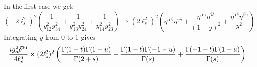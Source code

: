 \documentclass[11pt, class=article, crop=false]{standalone}
\begin{document}
\begin{enumerate}
	In the first case we get:
	\[
		\left(-2 \ell_s^2\right)^2 \left(\frac{1}{y_{12}^2 y_{34}^2} + \frac{1}{y_{13}^2 y_{24}^2} + \frac{1}{y_{14}^2 y_{23}^2} \right) \to \left(2 \ell_s^2\right)^2  \left(\eta^{\alpha \beta} \eta^{\gamma \delta} + \frac{\eta^{\alpha \gamma} \eta^{\beta \delta}}{(1-y)^{2}} + \frac{\eta^{\alpha \delta} \eta^{\beta \gamma}}{y^{2}} \right)  %
	\]
	Integrating $y$ from $0$ to $1$ gives
	\begin{equation}\label{eq:part1}
		\frac{i g_o^2 \cancel\delta^{26}}{4 \ell_s^6} \times (2 \ell_s^2)^2 \left(\frac{\Gamma(1-t) \Gamma(1-u)}{\Gamma(2+s)} + \frac{\Gamma(1-t) \Gamma(-1-u)}{\Gamma(s)} + \frac{\Gamma(-1-t) \Gamma(1-u)}{\Gamma(s)} \right)		
	\end{equation}

	

\end{enumerate}
\end{document}
